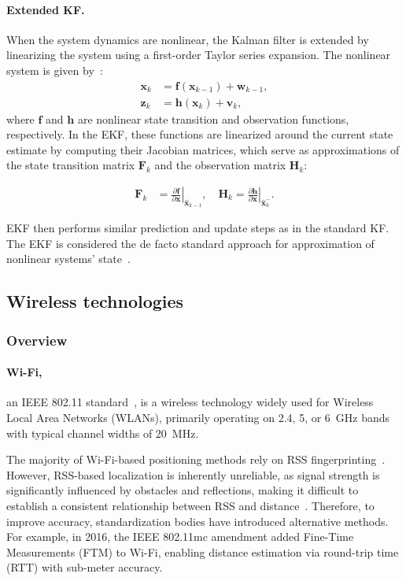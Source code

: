 \paragraph{Extended KF.} When the system dynamics are nonlinear, the Kalman filter is extended by linearizing the system using a first-order Taylor series expansion. The nonlinear system is given by~\cite{wiley_kalman}:
\begin{align}
    \mathbf{x}_k &= \bm{f}(\mathbf{x}_{k-1}) + \mathbf{w}_{k-1}, \\
    \mathbf{z}_k &= \bm{h}(\mathbf{x}_k) + \mathbf{v}_k,
\end{align}
where $\bm{f}$ and $\bm{h}$ are nonlinear state transition and observation functions, respectively. In the EKF, these functions are linearized around the current state estimate by computing their Jacobian matrices, which serve as approximations of the state transition matrix $\mathbf{F}_k$ and the observation matrix $\mathbf{H}_k$:

\begin{align}
    \mathbf{F}_{k} &= \left.\frac{\partial \bm{f}}{\partial \mathbf{x}}\right|_{\hat{\mathbf{x}}_{k-1}} , \quad
    \mathbf{H}_k = \left.\frac{\partial \bm{h}}{\partial \mathbf{x}}\right|_{\hat{\mathbf{x}}_k^-}.
\end{align}

EKF then performs similar prediction and update steps as in the standard KF. The EKF is considered the de facto standard approach for approximation of nonlinear systems' state~\cite{julier2004unscented}.

\subsection{Wireless technologies}

\subsubsection{Overview}

\paragraph{Wi-Fi,} an IEEE 802.11 standard~\cite{ieee80211}, is a wireless technology widely used for Wireless Local Area Networks (WLANs), primarily operating on 2.4, 5, or 6~\si{\giga\hertz} bands with typical channel widths of 20~\si{\mega\hertz}.

The majority of Wi-Fi-based positioning methods rely on RSS fingerprinting~\cite{leitch2023indoor}. However, RSS-based localization is inherently unreliable, as signal strength is significantly influenced by obstacles and reflections, making it difficult to establish a consistent relationship between RSS and distance~\cite{Asaad2022Review}. Therefore, to improve accuracy, standardization bodies have introduced alternative methods. For example, in 2016, the IEEE 802.11mc amendment added Fine-Time Measurements (FTM) to Wi-Fi, enabling distance estimation via round-trip time (RTT) with sub-meter accuracy.


